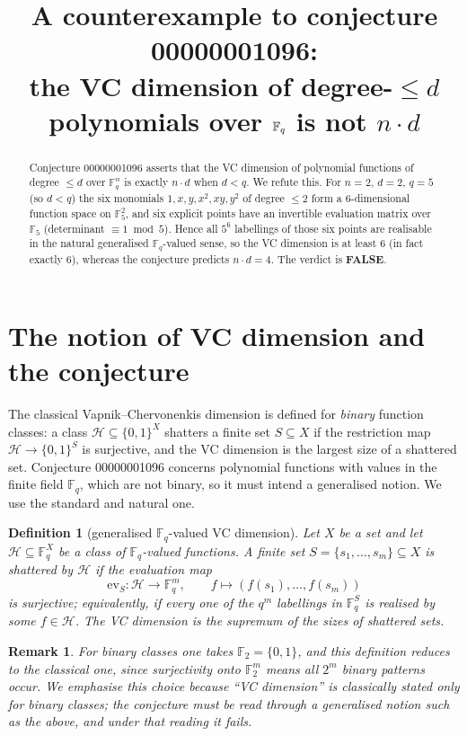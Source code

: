 \documentclass[11pt]{article}
\title{A counterexample to conjecture 00000001096:\\
the VC dimension of degree-$\le d$ polynomials over $\F_q$ is not $n\cdot d$}
\author{}
\date{}
\newtheorem{definition}[theorem]{Definition}
\newtheorem{remark}[theorem]{Remark}
\newcommand{\F}{\mathbb{F}}
\begin{document}
\maketitle

\begin{abstract}
Conjecture 00000001096 asserts that the VC dimension of polynomial functions
of degree $\le d$ over $\F_q^n$ is exactly $n\cdot d$ when $d<q$. We refute
this. For $n=2$, $d=2$, $q=5$ (so $d<q$) the six monomials
$1,x,y,x^2,xy,y^2$ of degree $\le 2$ form a $6$-dimensional function space on
$\F_5^2$, and six explicit points have an invertible evaluation matrix over
$\F_5$ (determinant $\equiv 1 \bmod 5$). Hence all $5^6$ labellings of those
six points are realisable in the natural generalised $\F_q$-valued sense, so
the VC dimension is at least $6$ (in fact exactly $6$), whereas the conjecture
predicts $n\cdot d=4$. The verdict is \textbf{FALSE}.
\end{abstract}

\section{The notion of VC dimension and the conjecture}

The classical Vapnik--Chervonenkis dimension is defined for \emph{binary}
function classes: a class $\mathcal{H}\subseteq\{0,1\}^X$ shatters a finite set
$S\subseteq X$ if the restriction map
$\mathcal{H}\to\{0,1\}^S$ is surjective, and the VC dimension is the largest
size of a shattered set. Conjecture 00000001096 concerns polynomial functions
with values in the finite field $\F_q$, which are not binary, so it must intend
a generalised notion. We use the standard and natural one.

\begin{definition}[generalised $\F_q$-valued VC dimension]
Let $X$ be a set and let $\mathcal{H}\subseteq \F_q^{X}$ be a class of
$\F_q$-valued functions. A finite set $S=\{s_1,\dots,s_m\}\subseteq X$ is
\emph{shattered} by $\mathcal{H}$ if the evaluation map
\[
  \mathrm{ev}_S \colon \mathcal{H}\to \F_q^{m},\qquad
  f\mapsto (f(s_1),\dots,f(s_m))
\]
is surjective; equivalently, if every one of the $q^{m}$ labellings in
$\F_q^{S}$ is realised by some $f\in\mathcal{H}$. The VC dimension is the
supremum of the sizes of shattered sets.
\end{definition}

\begin{remark}
For binary classes one takes $\F_2=\{0,1\}$, and this definition reduces to the
classical one, since surjectivity onto $\F_2^{m}$ means all $2^m$ binary
patterns occur. We emphasise this choice because ``VC dimension'' is classically
stated only for binary classes; the conjecture must be read through a
generalised notion such as the above, and under that reading it fails.
\end{remark}
\end{document}
